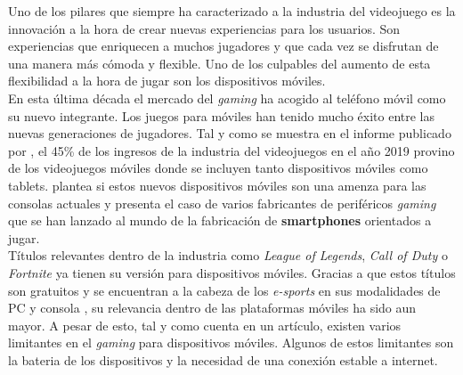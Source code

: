 Uno de los pilares que siempre ha caracterizado a la industria del videojuego es la innovaci\'on a la hora de crear nuevas experiencias para los usuarios. Son experiencias que enriquecen a muchos jugadores y que cada vez se disfrutan de una manera m\'as c\'omoda y flexible. Uno de los culpables del aumento de esta flexibilidad a la hora de jugar son los dispositivos m\'oviles. \\

En esta \'ultima d\'ecada el mercado del \textit{gaming} ha acogido al tel\'efono m\'ovil como su nuevo integrante. Los juegos para m\'oviles han tenido mucho \'exito entre las nuevas generaciones de jugadores. Tal y como se muestra en el informe publicado por \citep{AEVI2019}, el 45\% de los ingresos de la industria del videojuegos en el a\~no 2019 provino de los videojuegos m\'oviles donde se incluyen tanto dispositivos m\'oviles como tablets. \citep{moviles} plantea si estos nuevos dispositivos m\'oviles son una amenza para las consolas actuales y presenta el caso de varios fabricantes de perif\'ericos \textit{gaming} que se han lanzado al mundo de la fabricaci\'on de \textbf{smartphones} orientados a jugar. \\

T\'itulos relevantes dentro de la industria como \textit{League of Legends}, \textit{Call of Duty} o \textit{Fortnite} ya tienen su versi\'on para dispositivos m\'oviles. Gracias a que estos t\'itulos son gratuitos y se encuentran a la cabeza de los \textit{e-sports} en sus modalidades de PC y consola \citep*{TEOQ32020}, su relevancia dentro de las plataformas m\'oviles ha sido aun mayor. A pesar de esto, tal y como cuenta \citep{futuro} en un art\'iculo, existen varios limitantes en el \textit{gaming} para dispositivos m\'oviles. Algunos de estos limitantes son la bateria de los dispositivos y la necesidad de una conexi\'on estable a internet.\\

